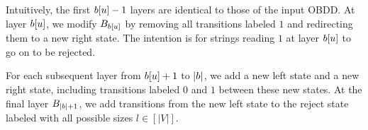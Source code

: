 

Intuitively, the first $b[u]-1$ layers are identical to those of the input OBDD. At layer $b[u]$, we modify $B_{b[u]}$ by removing all transitions labeled $1$ and redirecting them to a new right state. The intention is for strings reading $1$ at layer $b[u]$ to go on to be rejected.


For each subsequent layer from $b[u]+1$ to $|b|$, we add a new left state and a new right state, including transitions labeled $0$ and $1$ between these new states. At the final layer $B_{|b|+1}$, we add transitions from the new left state to the reject state labeled with all possible sizes $l \in [|V|]$.




